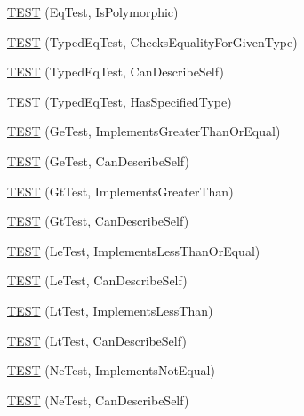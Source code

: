 \begin{DoxyCompactItemize}
\item 
\mbox{\hyperlink{namespacetesting_1_1gmock__matchers__test_ac3ea755ba2a8bb480cee70aa37ccafc2}{T\+E\+ST}} (Eq\+Test, Is\+Polymorphic)
\item 
\mbox{\hyperlink{namespacetesting_1_1gmock__matchers__test_a3e8d6cc259c1410a85572bc773bb21b9}{T\+E\+ST}} (Typed\+Eq\+Test, Checks\+Equality\+For\+Given\+Type)
\item 
\mbox{\hyperlink{namespacetesting_1_1gmock__matchers__test_a9baf261536023ac58ed65cdafcaf1602}{T\+E\+ST}} (Typed\+Eq\+Test, Can\+Describe\+Self)
\item 
\mbox{\hyperlink{namespacetesting_1_1gmock__matchers__test_ae0255a5de2ef537512379c3f8ff9e34f}{T\+E\+ST}} (Typed\+Eq\+Test, Has\+Specified\+Type)
\item 
\mbox{\hyperlink{namespacetesting_1_1gmock__matchers__test_a7d73fdbbee36ccf241ec6e328175655b}{T\+E\+ST}} (Ge\+Test, Implements\+Greater\+Than\+Or\+Equal)
\item 
\mbox{\hyperlink{namespacetesting_1_1gmock__matchers__test_a2718c8d5456b62ab7b060b2723939a72}{T\+E\+ST}} (Ge\+Test, Can\+Describe\+Self)
\item 
\mbox{\hyperlink{namespacetesting_1_1gmock__matchers__test_a87a9ac189a12e0b85964f03b3b9998b1}{T\+E\+ST}} (Gt\+Test, Implements\+Greater\+Than)
\item 
\mbox{\hyperlink{namespacetesting_1_1gmock__matchers__test_a2981bbdbf9cbd8864a6dde4ff4b06050}{T\+E\+ST}} (Gt\+Test, Can\+Describe\+Self)
\item 
\mbox{\hyperlink{namespacetesting_1_1gmock__matchers__test_af0cd1cfc3ff1272bfe06f31c5eb3ab8b}{T\+E\+ST}} (Le\+Test, Implements\+Less\+Than\+Or\+Equal)
\item 
\mbox{\hyperlink{namespacetesting_1_1gmock__matchers__test_a463bc4f6cdca489c05ad691e1254e2f3}{T\+E\+ST}} (Le\+Test, Can\+Describe\+Self)
\item 
\mbox{\hyperlink{namespacetesting_1_1gmock__matchers__test_a9f332401730e637d5c3923924dc339e3}{T\+E\+ST}} (Lt\+Test, Implements\+Less\+Than)
\item 
\mbox{\hyperlink{namespacetesting_1_1gmock__matchers__test_ae29bb32c74970fc22e7ac5d86e7e6c26}{T\+E\+ST}} (Lt\+Test, Can\+Describe\+Self)
\item 
\mbox{\hyperlink{namespacetesting_1_1gmock__matchers__test_a7319f919e57cf349f733bbdb56177daf}{T\+E\+ST}} (Ne\+Test, Implements\+Not\+Equal)
\item 
\mbox{\hyperlink{namespacetesting_1_1gmock__matchers__test_a8a743510a5256803d75c2d7735ec515a}{T\+E\+ST}} (Ne\+Test, Can\+Describe\+Self)

\end{DoxyCompactItemize}

